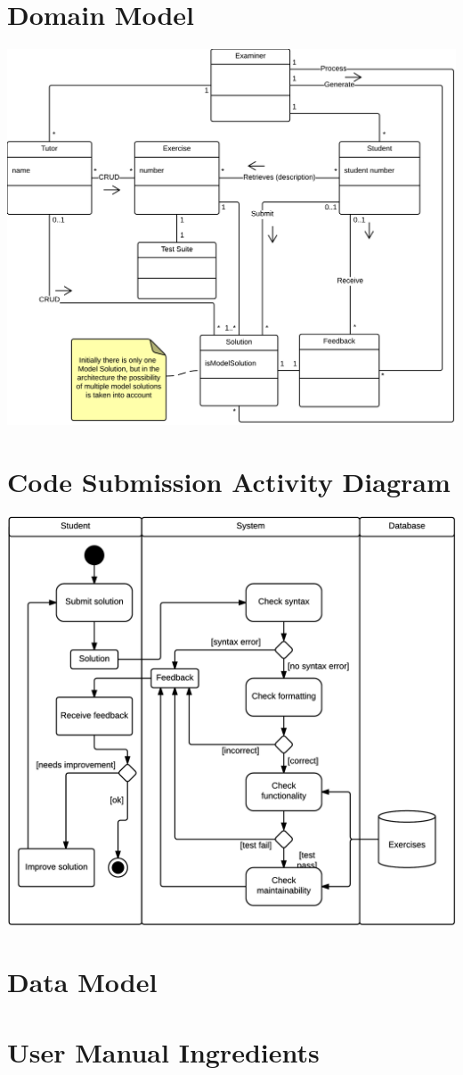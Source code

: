 \chapter{Domain Model} \label{app:domain-model}
\includegraphics[scale=0.75]{appendices/diagrams-images/domain-model}

\chapter{Code Submission Activity Diagram} \label{app:activity-diagram}
\includegraphics[scale=0.75]{appendices/diagrams-images/code-submission-activity-diagram}

\chapter{Data Model} \label{app:data-model}



\chapter{User Manual Ingredients} \label{app:user-manual}

